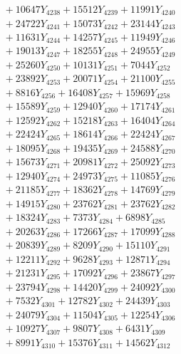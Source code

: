 \documentclass[a4paper,10pt]{article}
\begin{document}
{\begin{align}
&\;  + 10647 Y_{4238} + 15512 Y_{4239} + 11991 Y_{4240} \\[0.3ex]
&\;  + 24722 Y_{4241} + 15073 Y_{4242} + 23144 Y_{4243} \\[0.3ex]
&\;  + 11631 Y_{4244} + 14257 Y_{4245} + 11949 Y_{4246} \\[0.3ex]
&\;  + 19013 Y_{4247} + 18255 Y_{4248} + 24955 Y_{4249} \\[0.3ex]
&\;  + 25260 Y_{4250} + 10131 Y_{4251} + 7044 Y_{4252} \\[0.3ex]
&\;  + 23892 Y_{4253} + 20071 Y_{4254} + 21100 Y_{4255} \\[0.3ex]
&\;  + 8816 Y_{4256} + 16408 Y_{4257} + 15969 Y_{4258} \\[0.5ex]\allowbreak
&\;  + 15589 Y_{4259} + 12940 Y_{4260} + 17174 Y_{4261} \\[0.3ex]
&\;  + 12592 Y_{4262} + 15218 Y_{4263} + 16404 Y_{4264} \\[0.3ex]
&\;  + 22424 Y_{4265} + 18614 Y_{4266} + 22424 Y_{4267} \\[0.3ex]
&\;  + 18095 Y_{4268} + 19435 Y_{4269} + 24588 Y_{4270} \\[0.3ex]
&\;  + 15673 Y_{4271} + 20981 Y_{4272} + 25092 Y_{4273} \\[0.3ex]
&\;  + 12940 Y_{4274} + 24973 Y_{4275} + 11085 Y_{4276} \\[0.3ex]
&\;  + 21185 Y_{4277} + 18362 Y_{4278} + 14769 Y_{4279} \\[0.3ex]
&\;  + 14915 Y_{4280} + 23762 Y_{4281} + 23762 Y_{4282} \\[0.3ex]
&\;  + 18324 Y_{4283} + 7373 Y_{4284} + 6898 Y_{4285} \\[0.3ex]
&\;  + 20263 Y_{4286} + 17266 Y_{4287} + 17099 Y_{4288} \\[0.5ex]\allowbreak
&\;  + 20839 Y_{4289} + 8209 Y_{4290} + 15110 Y_{4291} \\[0.3ex]
&\;  + 12211 Y_{4292} + 9628 Y_{4293} + 12871 Y_{4294} \\[0.3ex]
&\;  + 21231 Y_{4295} + 17092 Y_{4296} + 23867 Y_{4297} \\[0.3ex]
&\;  + 23794 Y_{4298} + 14420 Y_{4299} + 24092 Y_{4300} \\[0.3ex]
&\;  + 7532 Y_{4301} + 12782 Y_{4302} + 24439 Y_{4303} \\[0.3ex]
&\;  + 24079 Y_{4304} + 11504 Y_{4305} + 12254 Y_{4306} \\[0.3ex]
&\;  + 10927 Y_{4307} + 9807 Y_{4308} + 6431 Y_{4309} \\[0.3ex]
&\;  + 8991 Y_{4310} + 15376 Y_{4311} + 14562 Y_{4312} \\[0.3ex]

\end{align}}
\end{document}
